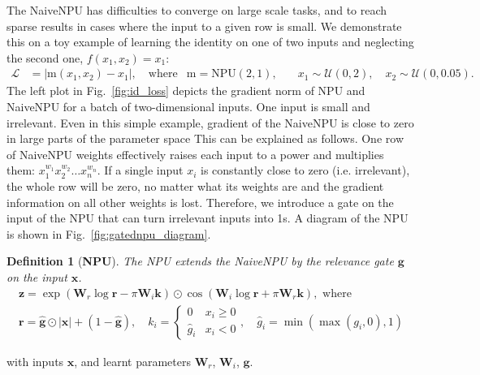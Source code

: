 \documentclass[9pt]{article}
\newtheorem*{definition}{Definition}
\newcommand{\Wre}{\bm W_{r}}
\newcommand{\Wim}{\bm W_{i}}
\newcommand{\npu}{\text{NPU}}
\begin{document}
The NaiveNPU has difficulties to converge on large scale tasks, and to reach
sparse results in cases where the input to a given row is small. We
demonstrate this on a toy example of learning the identity on one of two inputs and neglecting the second one, $f(x_1,x_2) = x_1$:
\begin{align}
  \nonumber
  \mathcal{L} &= |\text{m}(x_1,x_2) - x_1|, \quad \text{where}
  & \text{m} = \npu(2,1), \quad
  &x_1 \sim \mathcal U(0,2), \quad x_2 \sim \mathcal U(0,0.05).
\end{align}
The left plot in Fig.~\ref{fig:id_loss} depicts the gradient norm of NPU and
NaiveNPU for a batch of two-dimensional inputs. One input is small and
irrelevant. Even in this simple example, gradient of the NaiveNPU is close to
zero in large parts of the parameter space This can be explained as follows.
One row of NaiveNPU weights effectively raises each input to a power and
multiplies them: $x_1^{w_1} x_2^{w_2} \dots x_n^{w_n}$. If a single input $x_i$
is constantly close to zero (i.e. irrelevant), the whole row will be zero, no
matter what its weights are and the gradient information on all other weights
is lost.  Therefore, we introduce a gate on the input of the NPU that can turn
irrelevant inputs into 1s.
A diagram of the NPU is shown in Fig.~\ref{fig:gatednpu_diagram}.
\begin{definition}[{\bf NPU}]
  The NPU extends the NaiveNPU by the relevance gate $\bm g$ on the input $\bm x$.
   \begin{gather}
    \label{eq:gatednpu_def}
    \bm z = \exp(\Wre \log\bm r - \pi\Wim\bm k) 
          \odot \cos(\Wim\log \bm r + \pi\Wre\bm k), \text{ where } \\
    \nonumber
    \bm r = \bm{\hat g} \odot |\bm x| + (1-\bm{\hat g}),
    \quad
    k_i = \begin{cases}
       0  & x_i \geq 0 \\
      \hat g_i & x_i < 0
    \end{cases},
    \quad
    \hat g_i = \min(\max(g_i,0),1)
  \end{gather}
\end{definition}
with inputs $\bm x$, and learnt parameters $\Wre$, $\Wim$, $\bm g$.
\end{document}

